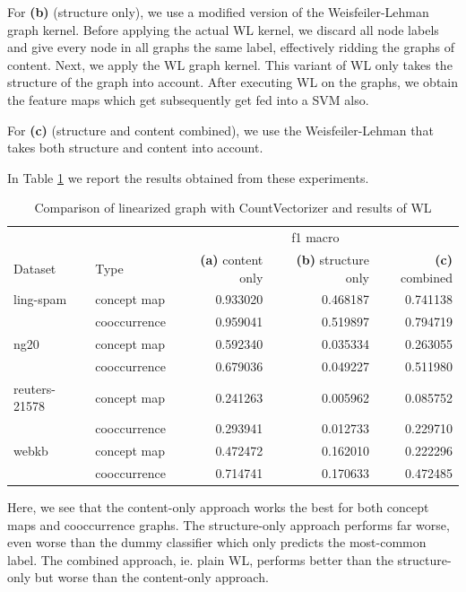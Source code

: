 For \textbf{(b)} (structure only), we use a modified version of the Weisfeiler-Lehman graph kernel. Before applying the actual WL kernel, we discard all node labels and give every node in all graphs the same label, effectively ridding the graphs of content. Next, we apply the WL graph kernel. This variant of WL only takes the structure of the graph into account.
After executing WL on the graphs, we obtain the feature maps which get subsequently get fed into a SVM also.

For \textbf{(c)} (structure and content combined), we use the Weisfeiler-Lehman that takes both structure and content into account.

In Table \ref{table:table_results_structure_vs_content} we report the results obtained from these experiments.

\begin{table}[htb!]
\centering
\begin{tabular}{llrrr}
          & & \multicolumn{3}{c}{f1 macro} \\
Dataset & Type & \textbf{(a)} content only & \textbf{(b)} structure only & \textbf{(c)} combined\\
\midrule
ling-spam & concept map &  0.933020 &  0.468187 &  0.741138 \\
          & cooccurrence &  0.959041 &  0.519897 &  0.794719 \\
\midrule
ng20 & concept map &  0.592340 &  0.035334 &  0.263055 \\
          & cooccurrence &  0.679036 &  0.049227 &  0.511980 \\
\midrule
reuters-21578 & concept map &  0.241263 &  0.005962 &  0.085752 \\
          & cooccurrence &  0.293941 &  0.012733 &  0.229710 \\
\midrule
webkb & concept map &  0.472472 &  0.162010 &  0.222296 \\
          & cooccurrence &  0.714741 &  0.170633 &  0.472485 \\
\bottomrule
\end{tabular}
\caption[Results: Linearized vs. WL]{Comparison of linearized graph with CountVectorizer and results of WL}\label{table:table_results_structure_vs_content}
\end{table}

Here, we see that the content-only approach works the best for both concept maps and cooccurrence graphs.
The structure-only approach performs far worse, even worse than the dummy classifier which only predicts the most-common label.
The combined approach, ie. plain WL, performs better than the structure-only but worse than the content-only approach.

